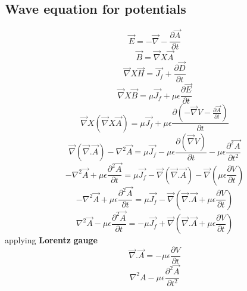 \subsection*{Wave equation for potentials}
\[
    \vec{E} = -\vec{\nabla} -\frac{\partial \vec{A}}{\partial t}
\]
\[
    \vec{B} = \vec{\nabla}X\vec{A}
\]
\[
    \vec{\nabla}X\vec{H} = \vec{J_{f} }+ \frac{\partial \vec{D}}{\partial t}
\]
\[
    \vec{\nabla}X\vec{B} = \mu \vec{J_f} + \mu \epsilon \frac{\partial \vec{E}}{\partial t}
\]
\[
    \vec{\nabla}X(\vec{\nabla}X\vec{A}) = \mu \vec{J_{f} }+ \mu \epsilon \frac{\partial \left(-\vec{\nabla}V - \frac{\partial \vec{A}}{\partial t}\right)}{\partial t}
\]
\[
    \vec{\nabla}(\vec{\nabla}.\vec{A}) - \nabla^2\vec{A} = \mu \vec{J_{f} }-\mu \epsilon \frac{\partial (\vec{\nabla}V)}{\partial t} - \mu \epsilon \frac{\partial ^2 \vec{A}}{\partial t^2}
\]
\[
    -\nabla^2 \vec{A} +\mu \epsilon \frac{\partial^2 \vec{A}}{\partial t} = \mu \vec{J_{f} }-\vec{\nabla}(\vec{\nabla}.\vec{A})-\vec{\nabla}(\mu \epsilon \frac{\partial V}{\partial t})
\]
\[
    -\nabla^2 \vec{A} +\mu \epsilon \frac{\partial^2 \vec{A}}{\partial t} = \mu \vec{J_{f} }-\vec{\nabla}(\vec{\nabla}.\vec{A}+\mu \epsilon \frac{\partial V}{\partial t})
\]
\[
    \nabla^2 \vec{A} -\mu \epsilon \frac{\partial^2 \vec{A}}{\partial t} = -\mu \vec{J_{f} }+\vec{\nabla}(\vec{\nabla}.\vec{A}+\mu \epsilon \frac{\partial V}{\partial t})
\]
applying \textbf{Lorentz}  \textbf{gauge} 
\[
    \vec{\nabla}.\vec{A} = - \mu \epsilon \frac{\partial V}{\partial t}
\]
\[
    \nabla^2 A - \mu \epsilon \frac{\partial ^2 \vec{A}}{\partial t^2}
\]
